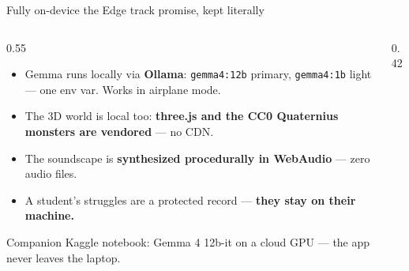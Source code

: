\documentclass[aspectratio=169,11pt]{beamer}
\begin{document}
\begin{frame}{Fully on-device \hfill {\normalsize\color{muted}the Edge track promise, kept literally}}
  \begin{columns}[T]
    \begin{column}{0.55\textwidth}
      \begin{itemize}\setlength\itemsep{0.3em}
        \item {\small Gemma runs locally via \textbf{Ollama}: \texttt{gemma4:12b} primary, \texttt{gemma4:1b} light --- one env var. Works in airplane mode.}
        \item {\small The 3D world is local too: \textbf{three.js and the CC0 Quaternius monsters are vendored} --- no CDN.}
        \item {\small The soundscape is \textbf{synthesized procedurally in WebAudio} --- zero audio files.}
        \item {\small A student's struggles are a protected record --- \textbf{they stay on their machine.}}
      \end{itemize}
      {\scriptsize\color{muted}Companion Kaggle notebook: Gemma 4 12b-it on a cloud GPU --- the app never leaves the laptop.}
    \end{column}
    \begin{column}{0.42\textwidth}
    \end{column}
  \end{columns}
\end{frame}
\end{document}
